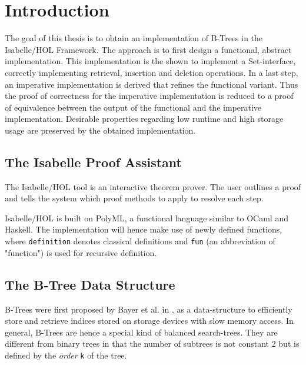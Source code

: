 
\chapter{Introduction}\label{chapter:introduction}

The goal of this thesis is to obtain an implementation of B-Trees in the Isabelle/HOL Framework.
The approach is to first design a functional, abstract implementation.
This implementation is the shown to implement a Set-interface,
correctly implementing retrieval, insertion and deletion operations.
In a last step, an imperative implementation is derived that
refines the functional variant.
Thus the proof of correctness for the imperative implementation
is reduced to a proof of equivalence between the output of the
functional and the imperative implementation.
Desirable properties regarding low runtime and high storage usage
are preserved by the obtained implementation.

\section{The Isabelle Proof Assistant}

The Isabelle/HOL tool is an interactive theorem prover.
The user outlines a proof and tells the system which proof methods to apply to
resolve each step.

Isabelle/HOL is built on PolyML, a functional language similar to OCaml
and Haskell.
The implementation will hence make use of newly defined functions, where
\texttt{definition} denotes classical definitions and \texttt{fun} (an abbreviation of "function")
is used for recursive definition.


\section{The B-Tree Data Structure}

B-Trees were first proposed by Bayer et al. in \parencite{DBLP:journals/acta/BayerM72},
as a data-structure to efficiently store and retrieve indices stored on storage devices
with slow memory access.
In general, B-Trees are hence a special kind of balanced search-trees.
They are different from binary trees in that the number of subtrees is not constant 2
but is defined by the \textit{order} \texttt{k} of the tree.


